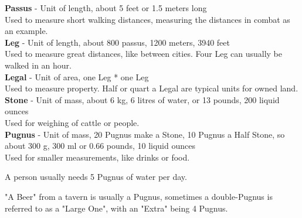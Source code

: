 \textbf{Passus} - Unit of length, about 5 feet or 1.5 meters long\\
Used to measure short walking distances, measuring the distances in combat as an example.\\


\textbf{Leg} - Unit of length, about 800 passus, 1200 meters, 3940 feet\\
Used to measure great distances, like between cities.
Four Leg can usually be walked in an hour.\\


\textbf{Legal} - Unit of area, one Leg * one Leg\\
Used to measure property.
Half or quart a Legal are typical units for owned land.\\


\textbf{Stone} - Unit of mass, about 6 kg, 6 litres of water, or 13 pounds, 200 liquid ounces\\
Used for weighing of cattle or people.\\


\textbf{Pugnus} - Unit of mass, 20 Pugnus make a Stone, 10 Pugnus a Half Stone, so about 300 g, 300 ml or 0.66 pounds, 10 liquid ounces\\
Used for smaller measurements, like drinks or food.

A person usually needs 5 Pugnus of water per day.

"A Beer" from a tavern is usually a Pugnus, sometimes a double-Pugnus is referred to as a  "Large One", with an "Extra" being 4 Pugnus.\\

